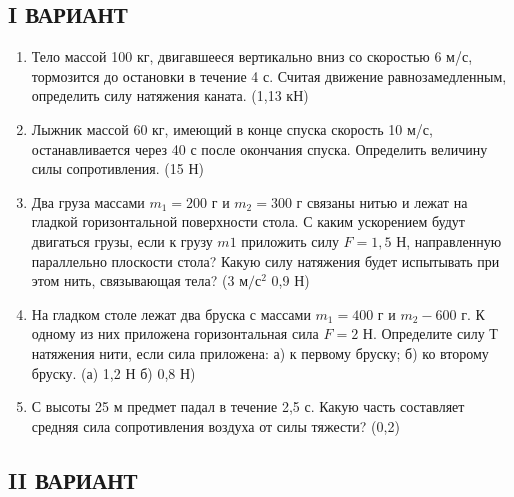 \documentclass[a6paper, 11pt]{diss_4}
\renewcommand{\'}{\,'}
\begin{document}
\subsection{I ВАРИАНТ}
\begin{enumerate}

  \item Тело массой 100 кг, двигавшееся вертикально вниз со скоростью 6 м/с, тормозится до остановки в течение 4 с. Считая движение равнозамедленным, определить силу натяжения каната. (1,13 кН)

  \item Лыжник массой 60 кг, имеющий в конце спуска скорость 10 м/с, останавливается через 40 с после окончания спуска. Определить величину силы сопротивления. (15 Н)

  \item Два груза массами $m_1 = 20$0 г и $m_2 = 300$ г связаны нитью и лежат на гладкой горизонтальной поверхности стола. С каким ускорением будут двигаться грузы, если к грузу $m1$ приложить силу $F = 1,5$ Н, направленную параллельно плоскости стола? Какую силу натяжения будет испытывать при этом нить, связывающая тела? (3 $м/с^2$     0,9 Н)


  \item На гладком столе лежат два бруска с массами $m_1 = 400$ г и $m_2 - 600$ г. К одному из них приложена горизонтальная сила $F = 2$ Н. Определите силу Т натяжения нити, если сила приложена: а) к первому бруску; б) ко второму бруску. (а) 1,2 Н    б) 0,8 Н)

  \item С высоты 25 м предмет падал в течение 2,5 с. Какую часть составляет средняя сила сопротивления воздуха от силы тяжести? (0,2)

\end{enumerate}


\subsection{II ВАРИАНТ}
\end{document}
